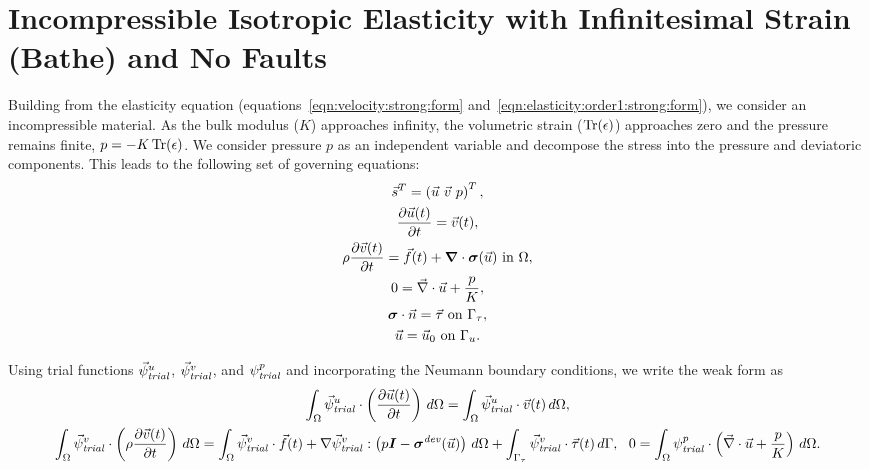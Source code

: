 \section{Incompressible Isotropic Elasticity with Infinitesimal Strain (Bathe) and No Faults}

Building from the elasticity equation
(equations~\ref{eqn:velocity:strong:form}
and~\ref{eqn:elasticity:order1:strong:form}), we consider an
incompressible material. As the bulk modulus ($K$) approaches
infinity, the volumetric strain ($\Tr(\epsilon)$) approaches zero and
the pressure remains finite, $p = -K \Tr(\epsilon)$. We consider
pressure $p$ as an independent variable and decompose the stress into the
pressure and deviatoric components. This leads to the following set of
governing equations:
\begin{gather}
  \vec{s}^T = \left( \vec{u} \ \vec{v} \ p \right)^T, \\
  \frac{\partial\vec{u}(t)}{\partial t} = \vec{v}(t), \\
  \rho \frac{\partial\vec{v}(t)}{\partial t} = \vec{f}(t) + \tensor{\nabla} \cdot 
\tensor{\sigma}(\vec{u}) 
\text{ in }\Omega, \\
  0 = \vec{\nabla} \cdot \vec{u} + \frac{p}{K}, \\
  \tensor{\sigma} \cdot \vec{n} = \vec{\tau} \text{ on }\Gamma_\tau, \\
  \vec{u} = \vec{u}_0 \text{ on }\Gamma_u.
\end{gather}

Using trial functions $\trialvec[u]$, $\trialvec[v]$, and $\trialscalar[p]$ and
incorporating the Neumann boundary conditions, we write the weak form
as
\begin{gather}
  \int_\Omega \trialvec[u] \cdot \left( \frac{\partial \vec{u}(t)}{\partial t} \right) \, 
d\Omega = 
  \int_\Omega \trialvec[u] \cdot \vec{v}(t) \, d\Omega, \\
  \int_\Omega \trialvec[v] \cdot \left( \rho \frac{\partial \vec{v}(t)}{\partial t} \right) \, 
d\Omega = 
  \int_\Omega \trialvec[v] \cdot \vec{f}(t) + \nabla \trialvec[v] : \left(p\tensor{I}-
\tensor{\sigma}^\mathit{dev}
(\vec{u})\right)\, d\Omega + \int_{\Gamma_\tau} \trialvec[v] \cdot \vec{\tau}(t) \, d\Gamma, \
\
  0 = \int_\Omega \trialscalar[p] \cdot \left(\vec{\nabla} \cdot \vec{u} + \frac{p}{K} \right) 
\, d\Omega.
\end{gather}

